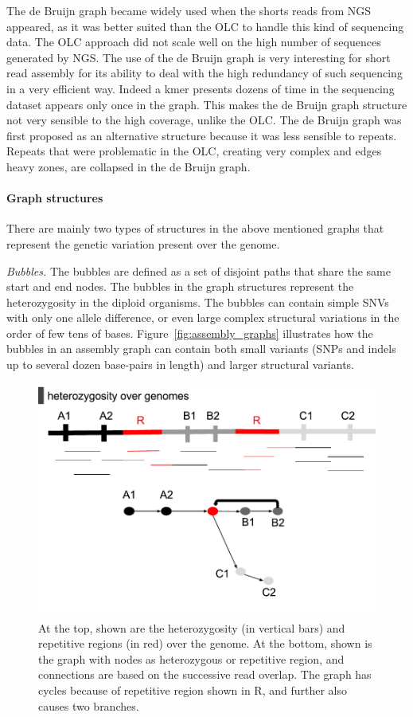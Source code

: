 The de Bruijn graph became widely used when the shorts reads from NGS appeared,
as it was better suited than the OLC to handle this kind of sequencing data. The OLC
approach did not scale well on the high number of sequences generated by NGS. The
use of the de Bruijn graph is very interesting for short read assembly for its ability to
deal with the high redundancy of such sequencing in a very efficient way. Indeed a kmer
presents dozens of time in the sequencing dataset appears only once in the graph. This
makes the de Bruijn graph structure not very sensible to the high coverage, unlike the
OLC. The de Bruijn graph was first proposed as an alternative structure \citep{pevzner2001eulerian} because it
was less sensible to repeats. Repeats that were problematic in the OLC, creating very
complex and edges heavy zones, are collapsed in the de Bruijn graph.

\paragraph{Graph structures} There are mainly two types of structures in the above mentioned graphs that represent the genetic variation present over the genome.


\textit{Bubbles.}
The bubbles are defined as a set of disjoint paths that share the same start and end nodes.
The bubbles in the graph structures represent the heterozygosity in the diploid organisms.
The bubbles can contain simple SNVs with only one allele difference, or even large complex structural variations in the order of few tens of bases.  
Figure~\ref{fig:assembly_graphs} illustrates how the bubbles in an assembly graph can contain both small variants (SNPs and indels up to several dozen base-pairs in length) and larger structural variants.

\begin{figure}[t!]\centering
\includegraphics[width=\columnwidth]{repeats.pdf}
\caption{At the top, shown are the heterozygosity (in vertical bars) and repetitive regions (in red) over the genome. At the bottom, shown is the graph with nodes as heterozygous or repetitive region, and connections are based on the successive read overlap.
The graph has cycles because of repetitive region shown in R, and further also causes two branches.}
\label{fig:repeats}
\end{figure}

